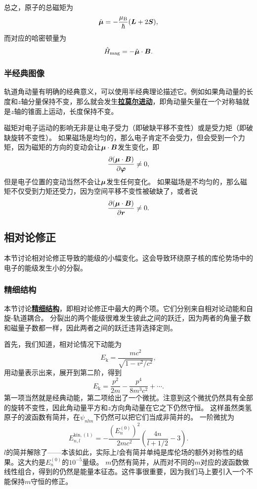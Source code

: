 \documentclass[UTF8, a4paper]{ctexart}
\newcommand*{\concept}[1]{\underline{\textbf{#1}}}
\begin{document}
总之，原子的总磁矩为
\begin{equation}
    \hat{\vb*{\mu}} = - \frac{\mu_\text{B}}{\hbar} (\vb*{L} + 2\vb*{S}),
\end{equation}
而对应的哈密顿量为
\begin{equation}
    \hat{H}_\text{mag} = - \hat{\vb*{\mu}} \cdot \vb*{B}.
    \label{eq:magnetic-hamiltonian}
\end{equation}

\subsubsection{半经典图像}

轨道角动量有明确的经典意义，可以使用半经典理论描述它。例如如果角动量的长度和$z$轴分量保持不变，那么就会发生\concept{拉莫尔进动}，即角动量矢量在一个对称轴就是$z$轴的锥面上运动，长度保持不变。

磁矩对电子运动的影响无非是让电子受力（即破缺平移不变性）或是受力矩（即破缺旋转不变性）。
如果磁场是均匀的，那么电子肯定不会受力，但会受到一个力矩，因为磁矩的方向的变动会让$\vb*{\mu} \cdot \vb*{B}$发生变化，即
\[
    \pdv{(\vb*{\mu} \cdot \vb*{B})}{\vb*{\varphi}} \neq 0,
\]
但是电子位置的变动当然不会让$\vb*{\mu}$发生任何变化。
如果磁场是不均匀的，那么磁矩不仅受到力矩还受力，因为空间平移不变性被破缺了，或者说
\[
    \pdv{(\vb*{\mu} \cdot \vb*{B})}{\vb*{r}} \neq 0.
\]

\subsection{相对论修正}

本节讨论相对论修正导致的能级的小幅变化。这会导致环绕原子核的库伦势场中的电子的能级发生小的分裂。

\subsubsection{精细结构}

本节讨论\concept{精细结构}，即相对论修正中最大的两个项。它们分别来自相对论动能和自旋-轨道耦合。
分裂出的两个能级很难发生彼此之间的跃迁，因为两者的角量子数和磁量子数都一样，因此两者之间的跃迁违背选择定则。

首先，我们知道，相对论情况下动能为
\[
    E_\text{k} = \frac{m c^2}{\sqrt{1 - v^2 / c^2}},
\]
用动量表示出来，展开到第二阶，得到
\begin{equation}
    E_\text{k} = \frac{p^2}{2m} - \frac{p^4}{8 m^3 c^2} + \cdots.
\end{equation}
第一项当然就是经典动能，第二项给出了一个微扰。注意到这个微扰仍然具有全部的旋转不变性，因此角动量平方和$z$方向角动量在它之下仍然守恒。
这样虽然类氢原子的波函数有简并，在$\psi_{nlm}$下仍然可以把它们当成非简并的。
一阶微扰为
\begin{equation}
    E^{\text{kin},(1)}_{n, l} = - \frac{(E^{(0)}_n)^2}{2 m c^2} \left( \frac{4 n}{l + 1/2} - 3 \right).
    \label{eq:kinetic-energy-relativity-correction}
\end{equation}
$l$的简并解除了——本该如此，实际上$l$会有简并单纯是库伦场的额外对称性的结果。这大约是$E_n^{(0)}$的$10^{-5}$量级。
$m$仍然有简并，从而对不同的$m$对应的波函数做线性组合，得到的仍然是能量本征态。这件事很重要，因为我们马上要引入一个不能保持$m$守恒的修正。
\end{document}
